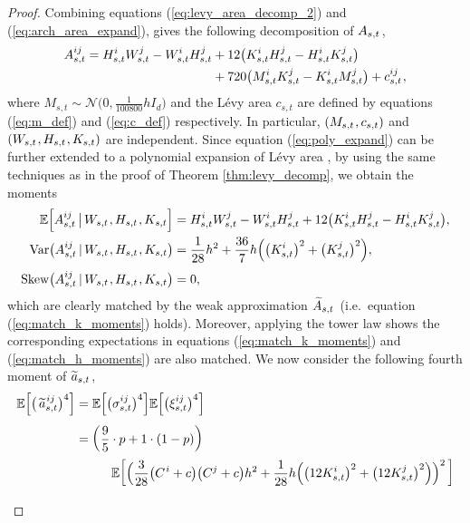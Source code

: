 \documentclass[sn-mathphys-num]{sn-jnl}%
\newcommand{\E}{\mathbb{E}}
\newcommand{\m}{\hspace{0.25mm}}
\newcommand{\mmm}{\hspace{10mm}}
\newcommand{\var}{\mathrm{Var}}
\begin{document}
\begin{proof}
Combining equations (\ref{eq:levy_area_decomp_2}) and (\ref{eq:arch_area_expand}), gives the following decomposition of $A_{s,t}\m$,
\begin{align}\label{eq:poly_expand}
A_{s,t}^{ij} = H_{s,t}^i W_{s,t}^j - W_{s,t}^i H_{s,t}^j & + 12\big(K_{s,t}^i H_{s,t}^j - H_{s,t}^i K_{s,t}^j\big)\\
& + 720\big(M_{s,t}^i K_{s,t}^j - K_{s,t}^i M_{s,t}^j\big) +  c_{s,t}^{ij}\m,\nonumber
\end{align}
where $M_{s,t} \sim\mathcal{N}\big(0, \frac{1}{100800}h I_d\big)$ and the L\'{e}vy area $c_{s,t}$ are defined by equations (\ref{eq:m_def})\vspace{0.5mm} and (\ref{eq:c_def}) respectively. In particular, $(M_{s,t}\m, c_{s,t})$ and $(W_{s,t}\m, H_{s,t}\m, K_{s,t})$ are independent. Since equation (\ref{eq:poly_expand}) can be further extended to a polynomial expansion of L\'{e}vy area \cite{foster2023levyarea},
by using the same techniques as in the proof of Theorem \ref{thm:levy_decomp}, we obtain the moments
\begin{align*}
\E\Big[A_{s,t}^{ij}\,\big|\, W_{s,t}\m, H_{s,t}\m, K_{s,t}\Big] & = H_{s,t}^i W_{s,t}^j - W_{s,t}^i H_{s,t}^j + 12\big(K_{s,t}^i H_{s,t}^j - H_{s,t}^i K_{s,t}^j\big),\\
\var\big(A_{s,t}^{ij} \,|\, W_{s,t}\m, H_{s,t}\m, K_{s,t}\big) & =\frac{1}{28}h^2 + \frac{36}{7} h\Big(\big(K_{s,t}^i\big)^2 + \big(K_{s,t}^j\big)^2\Big),\\[3pt]
\mathrm{Skew}\big(A_{s,t}^{ij} \,|\, W_{s,t}\m, H_{s,t}\m, K_{s,t}\big) & = 0,
\end{align*}
which are clearly matched by the weak approximation $\widetilde{A}_{s,t}\m$ (i.e.~equation (\ref{eq:match_k_moments}) holds).
Moreover, applying the tower law shows the corresponding expectations in equations (\ref{eq:match_k_moments}) and (\ref{eq:match_h_moments}) are also matched. We now consider the following fourth moment of $\widetilde{a}_{s,t}\m$,
\begin{align*}
\E\Big[\big(\,\widetilde{a}_{s,t}^{\m ij}\big)^4 \Big] & = \E\Big[\big(\sigma_{s,t}^{ij}\big)^4\Big]\E\Big[\big(\xi_{s,t}^{ij}\big)^4\Big]\\[3pt]
& = \bigg(\frac{9}{5}\cdot p + 1\cdot(1-p)\bigg)\\[-1pt]
&\mmm\E\bigg[\Big(\frac{3}{28}\big(C^{\m i} + c\big)\big(C^j + c\big)h^2 + \frac{1}{28}h\Big(\big(12 K_{s,t}^i\big)^2 + \big(12 K_{s,t}^j\big)^2\Big)\Big)^2\,\bigg]\\[3pt]

\end{align*}
\end{proof}
\end{document}
